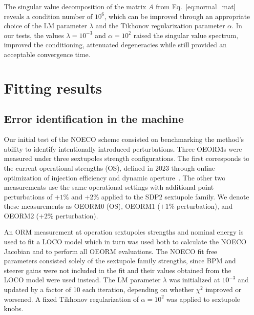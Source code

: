 \documentclass[%
               ]{jacow}
\begin{document}
The singular value decomposition of the matrix $A$ from Eq.~\eqref{eq:normal_mat} reveals a condition number of $10^{6}$, which can be improved through an appropriate choice of the LM parameter $\lambda$ and the Tikhonov regularization parameter $\alpha$. In our tests, the values $\lambda=10^{-3}$ and $\alpha=10^{2}$ raised the singular value spectrum, improved the conditioning, attenuated degeneracies while still provided an acceptable convergence time.

\section{Fitting results}
\subsection{Error identification in the machine}
Our initial test of the NOECO scheme consisted on benchmarking the method's ability to identify intentionally introduced perturbations. Three OEORMs were measured under three sextupoles strength configurations. The first corresponds to the current operational strengths (OS), defined in 2023 through online optimization of injection efficiency and dynamic aperture~\cite{vellosomatheus_online_2023}. The other two measurements use the same operational settings with additional point perturbations of \(+1\%\) and \(+2\%\) applied to the SDP2 sextupole family. We denote these measurements as OEORM0 (OS), OEORM1 ($+1\%$ perturbation), and OEORM2 ($+2\%$ perturbation). 

An ORM measurement at operation sextupoles strengths and nominal energy is used to fit a LOCO model which in turn was used both to calculate the NOECO Jacobian and to perform all OEORM evaluations. The NOECO fit free parameters consisted solely of the sextupole family strengths, since BPM and steerer gains were not included in the fit and their values obtained from the LOCO model were used instead. The LM parameter \(\lambda\) was initialized at \(10^{-3}\) and updated by a factor of 10 each iteration, depending on whether \(\chi^2\) improved or worsened. A fixed Tikhonov regularization of $\alpha=10^{2}$ was applied to sextupole knobs.
\end{document}
